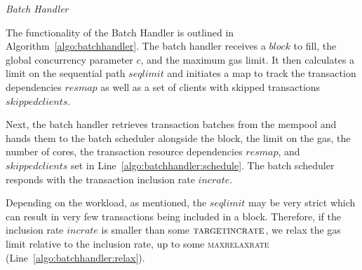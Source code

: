 \begin{algorithm}[t]

\centering
\caption{\textsl{Batch Handler}}
\label{algo:batchhandler}
\begin{algorithmic}[1]

 
 
 
 
 \label{algo:batchhandler:schedule}
 \label{algo:batchhandler:check}
\EndIf
{} \label{algo:batchhandler:relax}
\EndIf
\EndFor

\EndProcedure
\end{algorithmic}
\end{algorithm}

The functionality of the Batch Handler is outlined in Algorithm~\ref{algo:batchhandler}. The batch handler receives a $block$ to fill, the global concurrency parameter $c$, and the maximum gas limit. It then calculates a limit on the sequential path $seqlimit$ and initiates a map to track the transaction dependencies $resmap$ as well as a set of clients with skipped transactions $skippedclients$. 

Next, the batch handler retrieves transaction batches from the mempool and hands them to the batch scheduler alongside the block, the limit on the gas, the number of cores, the transaction resource dependencies $resmap$, and $skippedclients$ set in Line~\ref{algo:batchhandler:schedule}.
The batch scheduler responds with the transaction inclusion rate $incrate$.

Depending on the workload, as mentioned, the $seqlimit$ may be very strict which can result in very few transactions being included in a block.
Therefore, if the inclusion rate $incrate$ is smaller than some $\textsc{targetincrate}$, we relax the gas limit relative to the inclusion rate, up to some \textsc{maxrelaxrate} (Line~\ref{algo:batchhandler:relax}).

